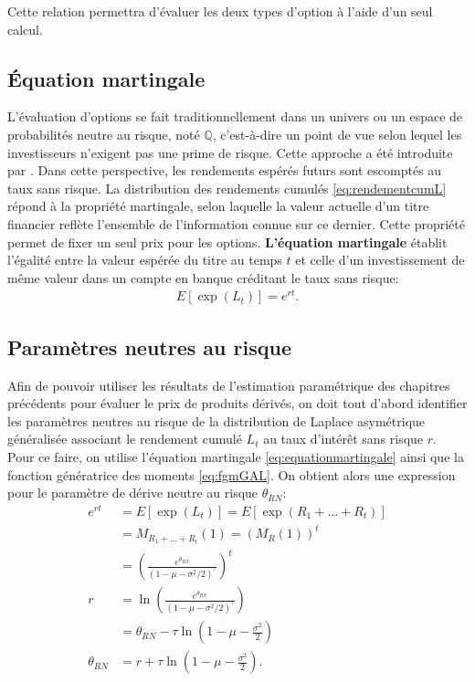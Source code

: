 Cette relation permettra d'évaluer les deux types d'option à l'aide
d'un seul calcul.

\subsection{Équation martingale}
\label{sec:equationmartingale}
L'évaluation d'options se fait traditionnellement dans un univers ou
un espace de probabilités neutre au risque, noté $\mathbb{Q}$,
c'est-à-dire un point de vue selon lequel les investisseurs n'exigent
pas une prime de risque. Cette approche a été introduite par
\cite{black1973pricing}. Dans cette perspective, les rendements
espérés futurs sont escomptés au taux sans risque. La distribution des
rendements cumulés \eqref{eq:rendementcumL} répond à la propriété
martingale, selon laquelle la valeur actuelle d'un titre financier
reflète l'ensemble de l'information connue sur ce dernier. Cette
propriété permet de fixer un seul prix pour les
options. \textbf{L'équation martingale} établit l'égalité entre la
valeur espérée du titre au temps $t$ et celle d'un investissement de
même valeur dans un compte en banque créditant le taux sans risque:
\begin{align}
  \label{eq:equationmartingale}
  E\left[\exp(L_t) \right] = e^{rt}.
\end{align}

\subsection{Paramètres neutres au risque}
\label{sec:GALrn}

Afin de pouvoir utiliser les résultats de l'estimation paramétrique
des chapitres précédents pour évaluer le prix de produits dérivés, on
doit tout d'abord identifier les paramètres neutres au risque de la
distribution de Laplace asymétrique généralisée associant le
rendement cumulé $L_t$ au taux d'intérêt sans risque $r$. Pour ce
faire, on utilise l'équation martingale \eqref{eq:equationmartingale}
ainsi que la fonction génératrice des moments \eqref{eq:fgmGAL}. On
obtient alors une expression pour le paramètre de dérive neutre au
risque $\theta_{RN}$:
\begin{align}
  e^{rt} &= E\left[\exp(L_t) \right]
  = E\left[\exp(R_1+\ldots+R_t) \right] \nonumber\\
  &= M_{R_1+\ldots+R_t}(1)
  = (M_{R}(1))^t \nonumber\\
  &= \left(\frac{e^{\theta_{RN}}}{(1-\mu-\sigma^2/2)^{\tau}} \right)^t \nonumber\\
  r &= \ln \left(\frac{e^{\theta_{RN}}}{(1-\mu-\sigma^2/2)^{\tau}} \right) \nonumber\\
  &= \theta_{RN} - \tau\ln(1-\mu-\frac{\sigma^2}{2}) \nonumber\\
  \theta_{RN} &= r +
  \tau\ln(1-\mu-\frac{\sigma^2}{2}). \label{eq:martingaleGAL}
\end{align}

